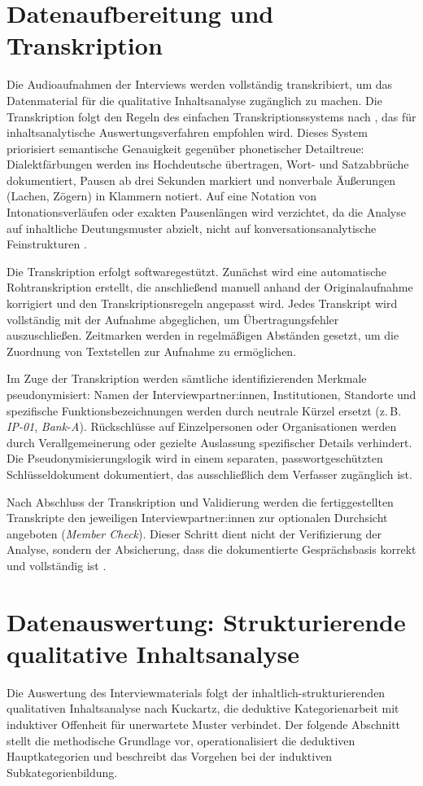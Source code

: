 \section{Datenaufbereitung und Transkription}
\label{met:datenaufbereitung}
Die Audioaufnahmen der Interviews werden vollständig transkribiert, um das Datenmaterial für die qualitative Inhaltsanalyse zugänglich zu machen. Die Transkription folgt den Regeln des einfachen Transkriptionssystems nach \textcite{dresingTranskriptionenQualitativerDaten2017}, das für inhaltsanalytische Auswertungsverfahren empfohlen wird. Dieses System priorisiert semantische Genauigkeit gegenüber phonetischer Detailtreue: Dialektfärbungen werden ins Hochdeutsche übertragen, Wort- und Satzabbrüche dokumentiert, Pausen ab drei Sekunden markiert und nonverbale Äußerungen (Lachen, Zögern) in Klammern notiert. Auf eine Notation von Intonationsverläufen oder exakten Pausenlängen wird verzichtet, da die Analyse auf inhaltliche Deutungsmuster abzielt, nicht auf konversationsanalytische Feinstrukturen \parencite{flick2017}.

Die Transkription erfolgt softwaregestützt. Zunächst wird eine automatische Rohtranskription erstellt, die anschließend manuell anhand der Originalaufnahme korrigiert und den Transkriptionsregeln angepasst wird. Jedes Transkript wird vollständig mit der Aufnahme abgeglichen, um Übertragungsfehler auszuschließen. Zeitmarken werden in regelmäßigen Abständen gesetzt, um die Zuordnung von Textstellen zur Aufnahme zu ermöglichen.

Im Zuge der Transkription werden sämtliche identifizierenden Merkmale pseudonymisiert: Namen der Interviewpartner:innen, Institutionen, Standorte und spezifische Funktionsbezeichnungen werden durch neutrale Kürzel ersetzt (z.\,B. \textit{IP-01}, \textit{Bank-A}). Rückschlüsse auf Einzelpersonen oder Organisationen werden durch Verallgemeinerung oder gezielte Auslassung spezifischer Details verhindert. Die Pseudonymisierungslogik wird in einem separaten, passwortgeschützten Schlüsseldokument dokumentiert, das ausschließlich dem Verfasser zugänglich ist.

Nach Abschluss der Transkription und Validierung werden die fertiggestellten Transkripte den jeweiligen Interviewpartner:innen zur optionalen Durchsicht angeboten (\textit{Member Check}). Dieser Schritt dient nicht der Verifizierung der Analyse, sondern der Absicherung, dass die dokumentierte Gesprächsbasis korrekt und vollständig ist \parencite{flick2017}.


\section{Datenauswertung: Strukturierende qualitative Inhaltsanalyse}
\label{met:datenauswertung}
Die Auswertung des Interviewmaterials folgt der inhaltlich-strukturierenden qualitativen Inhaltsanalyse nach Kuckartz, die deduktive Kategorienarbeit mit induktiver Offenheit für unerwartete Muster verbindet. Der folgende Abschnitt stellt die methodische Grundlage vor, operationalisiert die deduktiven Hauptkategorien und beschreibt das Vorgehen bei der induktiven Subkategorienbildung.

